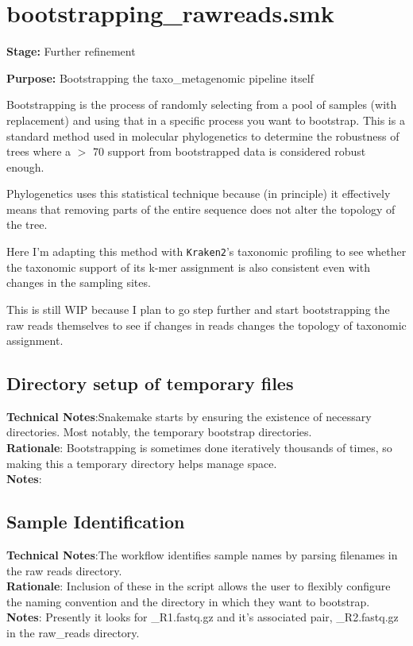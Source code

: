 \documentclass[11pt]{report}
\begin{document}
\newpage
\linenumbers*
\section{bootstrapping\_rawreads.smk}
\textbf{Stage:} Further refinement

\textbf{Purpose:} Bootstrapping the taxo\_metagenomic pipeline itself


Bootstrapping is the process of randomly selecting from a pool of samples (with replacement) and using that in a specific process you want to bootstrap. This is a standard method used in molecular phylogenetics to determine the robustness of trees where a $>$ 70 support from bootstrapped data is considered robust enough. 


\begin{tcolorbox}[colback=gray!10!white, coltitle=white, colframe=gray!80!black, title=The principle of bootstrapping in phylogenetics]
	Phylogenetics uses this statistical technique because (in principle) it effectively means that removing parts of the entire sequence does not alter the topology of the tree. 
	
	Here I'm adapting this method with \texttt{Kraken2}'s taxonomic profiling to see whether the taxonomic support of its k-mer assignment is also consistent even with changes in the sampling sites.
	
	This is still WIP because I plan to go step further and start bootstrapping the raw reads themselves to see if changes in reads changes the topology of taxonomic assignment. 
\end{tcolorbox}

\subsection{Directory setup of temporary files}
\textbf{Technical Notes}:Snakemake starts by ensuring the existence of necessary directories. Most notably, the temporary bootstrap directories.\\
\textbf{Rationale}: Bootstrapping is sometimes done iteratively thousands of times, so making this a temporary directory helps manage space. 
\\ \textbf{Notes}:
\subsection{Sample Identification}
\textbf{Technical Notes}:The workflow identifies sample names by parsing filenames in the raw reads directory.\\
\textbf{Rationale}: Inclusion of these in the script allows the user to flexibly configure the naming convention and the directory in which they want to bootstrap. 
\\ \textbf{Notes}: Presently it looks for \_R1.fastq.gz and it's associated pair, \_R2.fastq.gz in the raw\_reads directory. 
\end{document}
